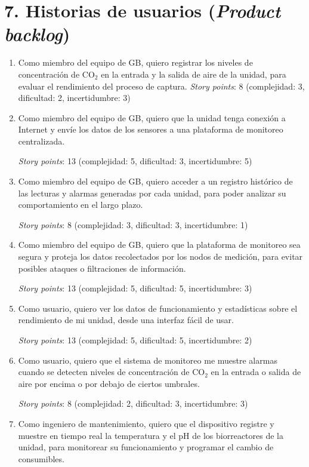 \documentclass[
11pt, %
]{charter}
\begin{document}
\section{7. Historias de usuarios (\textit{Product backlog})}
\label{sec:backlog}
\begin{enumerate}
\item Como miembro del equipo de GB, quiero registrar los niveles de concentración de CO$_2$ en la entrada y la salida de aire de la unidad, para evaluar el rendimiento del proceso de captura.
\textit{Story points}: 8 (complejidad: 3, dificultad: 2, incertidumbre: 3)

\item Como miembro del equipo de GB, quiero que la unidad tenga conexión a Internet y envíe los datos de los sensores a una plataforma de monitoreo centralizada.

\textit{Story points}: 13 (complejidad: 5, dificultad: 3, incertidumbre: 5)

\item Como miembro del equipo de GB, quiero acceder a un registro histórico de las lecturas y alarmas generadas por cada unidad, para poder analizar su comportamiento en el largo plazo. 

\textit{Story points}: 8 (complejidad: 3, dificultad: 3, incertidumbre: 1)

\item Como miembro del equipo de GB, quiero que la plataforma de monitoreo sea segura y proteja los datos recolectados por los nodos de medición, para evitar posibles ataques o filtraciones de información. 

\textit{Story points}: 13 (complejidad: 5, dificultad: 5, incertidumbre: 3)

\item Como usuario, quiero ver los datos de funcionamiento y estadísticas sobre el rendimiento de mi unidad, desde una interfaz fácil de usar. 

\textit{Story points}: 13 (complejidad: 5, dificultad: 5, incertidumbre: 2)

\item Como usuario, quiero que el sistema de monitoreo me muestre alarmas cuando se detecten niveles de concentración de CO$_2$ en la entrada o salida de aire por encima o por debajo de ciertos umbrales. 

\textit{Story points}: 8 (complejidad: 2, dificultad: 3, incertidumbre: 3)

\item Como ingeniero de mantenimiento, quiero que el dispositivo registre y muestre en tiempo real la temperatura y el pH de los biorreactores de la unidad, para monitorear su funcionamiento y programar el cambio de consumibles.


\end{enumerate}
\end{document}
